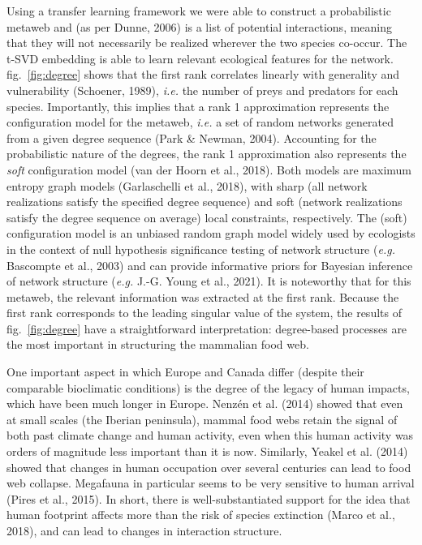 \documentclass[10pt,oneside]{article}
\begin{document}
Using a transfer learning framework we were able to construct a
probabilistic metaweb and (as per Dunne, 2006) is a list of potential
interactions, meaning that they will not necessarily be realized
wherever the two species co-occur. The t-SVD embedding is able to learn
relevant ecological features for the network. fig.~\ref{fig:degree}
shows that the first rank correlates linearly with generality and
vulnerability (Schoener, 1989), \emph{i.e.} the number of preys and
predators for each species. Importantly, this implies that a rank 1
approximation represents the configuration model for the metaweb,
\emph{i.e.} a set of random networks generated from a given degree
sequence (Park \& Newman, 2004). Accounting for the probabilistic nature
of the degrees, the rank 1 approximation also represents the \emph{soft}
configuration model (van der Hoorn et al., 2018). Both models are
maximum entropy graph models (Garlaschelli et al., 2018), with sharp
(all network realizations satisfy the specified degree sequence) and
soft (network realizations satisfy the degree sequence on average) local
constraints, respectively. The (soft) configuration model is an unbiased
random graph model widely used by ecologists in the context of null
hypothesis significance testing of network structure (\emph{e.g.}
Bascompte et al., 2003) and can provide informative priors for Bayesian
inference of network structure (\emph{e.g.} J.-G. Young et al., 2021).
It is noteworthy that for this metaweb, the relevant information was
extracted at the first rank. Because the first rank corresponds to the
leading singular value of the system, the results of
fig.~\ref{fig:degree} have a straightforward interpretation:
degree-based processes are the most important in structuring the
mammalian food web.

One important aspect in which Europe and Canada differ (despite their
comparable bioclimatic conditions) is the degree of the legacy of human
impacts, which have been much longer in Europe. Nenzén et al. (2014)
showed that even at small scales (the Iberian peninsula), mammal food
webs retain the signal of both past climate change and human activity,
even when this human activity was orders of magnitude less important
than it is now. Similarly, Yeakel et al. (2014) showed that changes in
human occupation over several centuries can lead to food web collapse.
Megafauna in particular seems to be very sensitive to human arrival
(Pires et al., 2015). In short, there is well-substantiated support for
the idea that human footprint affects more than the risk of species
extinction (Marco et al., 2018), and can lead to changes in interaction
structure.
\end{document}
